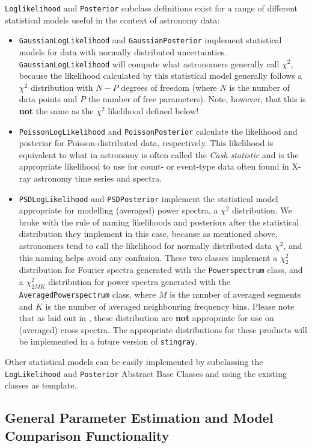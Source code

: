 \documentclass[12pt]{emulateapj}
\newcommand{\stingray}{\texttt{stingray}\xspace}
\newcommand{\powerspectrum}{\texttt{Powerspectrum}\xspace}
\begin{document}
\verb|Loglikelihood| and \verb|Posterior| subclass definitions exist for a range of different statistical models useful in the context of astronomy data:
\begin{itemize}
\item{\verb|GaussianLogLikelihood| and \verb|GaussianPosterior| implement statistical models for data with normally distributed uncertainties. \verb|GaussianLogLikelihood| will compute what astronomers generally call $\chi^2$, because the likelihood calculated by this statistical model generally follows a $\chi^2$ distribution with $N-P$ degrees of freedom (where $N$ is the number of data points and $P$ the number of free parameters). Note, however, that this is \textbf{not} the same as the $\chi^2$ likelihood defined below!}
\item{\verb|PoissonLogLikelihood| and \verb|PoissonPosterior| calculate the likelihood and posterior for Poisson-distributed data, respectively. This likelihood is equivalent to what in astronomy is often called the \textit{Cash statistic} \citep{cash1979} and is the appropriate likelihood to use for count- or event-type data often found in X-ray astronomy time series and spectra.}
\item{\verb|PSDLogLikelihood| and \verb|PSDPosterior| implement the statistical model appropriate for modelling (averaged) power spectra, a $\chi^2$ distribution. We broke with the rule of naming likelihoods and posteriors after the statistical distribution they implement in this case, because as mentioned above, astronomers tend to call the likelihood for normally distributed data $\chi^2$, and this naming helps avoid any confusion. These two classes implement a $\chi^2_2$ distribution for Fourier spectra generated with the \powerspectrum class, and a $\chi^2_{2MK}$ distribution for power spectra generated with the \texttt{AveragedPowerspectrum} class, where $M$ is the number of averaged segments and $K$ is the number of averaged neighbouring frequency bins. Please note that as laid out in \citet{huppenkothen2017}, these distribution are \textbf{not} appropriate for use on (averaged) cross spectra. The appropriate distributions for these products will be implemented in a future version of \stingray.}
\end{itemize}

Other statistical models can be easily implemented by subclassing the \verb|LogLikelihood| and \verb|Posterior| Abstract Base Classes and using the existing classes as template..

\subsection{General Parameter Estimation and Model Comparison Functionality}
\end{document}
